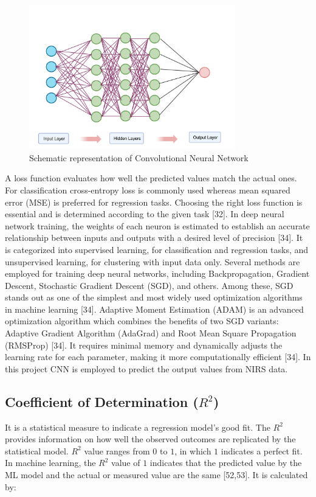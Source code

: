 \documentclass[12pt,a4paper]{report}
\begin{document}
\begin{figure}[h]
    \centering
    \includegraphics[width=0.8\textwidth]{Figures/cnn.png}
    \caption{Schematic representation of Convolutional Neural Network }
    \label{fig:cnn}
\end{figure}

A loss function evaluates how well the predicted values match the actual ones.  For classification cross-entropy loss is commonly used whereas mean squared error (MSE) is preferred for regression tasks. Choosing the right loss function is essential and is determined according to the given task [32]. In deep neural network training, the weights of each neuron is estimated to establish an accurate relationship between inputs and outputs with a desired level of precision [34].
It is categorized into supervised learning, for classification and regression tasks, and unsupervised learning, for clustering with input data only. Several methods are employed for training deep neural networks, including Backpropagation, Gradient Descent, Stochastic Gradient Descent (SGD), and others. Among these, SGD stands out as one of the simplest and most widely used optimization algorithms in machine learning [34]. Adaptive Moment Estimation (ADAM) is an advanced 
optimization algorithm which combines the benefits of two SGD variants: Adaptive Gradient Algorithm (AdaGrad) and Root Mean Square Propagation (RMSProp) [34]. It requires minimal memory and dynamically adjusts the learning rate for each parameter, making it more computationally efficient [34]. In this project CNN is employed to predict the output values from NIRS data. \\

\subsection*{Coefficient of Determination ($R^2$)}
It is a statistical measure to indicate a regression model's good fit. The $R^2$ provides information on how well the observed outcomes are replicated by the statistical model. $R^2$ value ranges from $0$ to $1$, in which $1$ indicates a perfect fit. In machine learning, the $R^2$ value of $1$ indicates that the predicted value by the ML model and the actual or measured value are the same [52,53]. It is calculated by: \\
\end{document}
